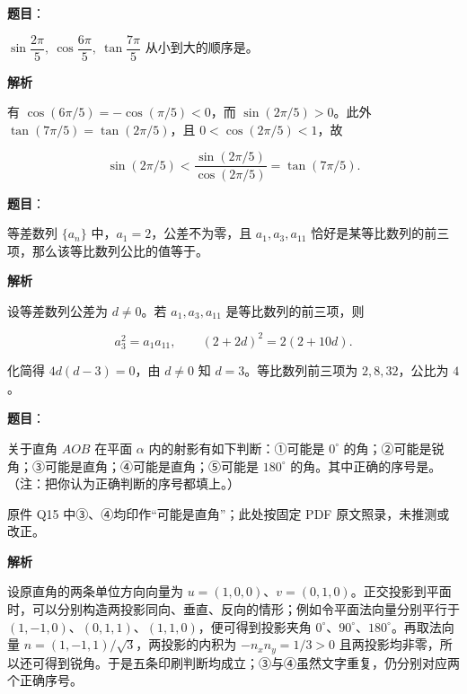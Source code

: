 \begin{answer}

\textbf{题目}：

\(\sin\dfrac{2\pi}{5},\ \cos\dfrac{6\pi}{5},\ \tan\dfrac{7\pi}{5}\) 从小到大的顺序是\gkblank{}。

\textbf{解析}

有 $\cos(6\pi/5)=-\cos(\pi/5)<0$，而 $\sin(2\pi/5)>0$。此外 $\tan(7\pi/5)=\tan(2\pi/5)$，且 $0<\cos(2\pi/5)<1$，故

\nopagebreak[4]
\[\sin(2\pi/5)<\frac{\sin(2\pi/5)}{\cos(2\pi/5)}=\tan(7\pi/5).\]


\end{answer}
\begin{answer}

\textbf{题目}：

等差数列 \(\{a_n\}\) 中，\(a_1=2\)，公差不为零，且 \(a_1,a_3,a_{11}\) 恰好是某等比数列的前三项，那么该等比数列公比的值等于\gkblank{}。

\textbf{解析}

设等差数列公差为 $d\ne0$。若 $a_1,a_3,a_{11}$ 是等比数列的前三项，则

\nopagebreak[4]
\[a_3^2=a_1a_{11},\qquad (2+2d)^2=2(2+10d).\]

化简得 $4d(d-3)=0$，由 $d\ne0$ 知 $d=3$。等比数列前三项为 $2,8,32$，公比为 $4$。


\end{answer}
\begin{answer}

\textbf{题目}：

关于直角 \(AOB\) 在平面 \(\alpha\) 内的射影有如下判断：①可能是 \(0^\circ\) 的角；②可能是锐角；③可能是直角；④可能是直角；⑤可能是 \(180^\circ\) 的角。其中正确的序号是\gkblank{}。（注：把你认为正确判断的序号都填上。）

\begin{gktip}
原件 Q15 中③、④均印作“可能是直角”；此处按固定 PDF 原文照录，未推测或改正。
\end{gktip}

\textbf{解析}

设原直角的两条单位方向向量为 $u=(1,0,0)$、$v=(0,1,0)$。正交投影到平面时，可以分别构造两投影同向、垂直、反向的情形；例如令平面法向量分别平行于 $(1,-1,0)$、$(0,1,1)$、$(1,1,0)$，便可得到投影夹角 $0^\circ$、$90^\circ$、$180^\circ$。再取法向量 $n=(1,-1,1)/\sqrt3$，两投影的内积为 $-n_xn_y=1/3>0$ 且两投影均非零，所以还可得到锐角。于是五条印刷判断均成立；③与④虽然文字重复，仍分别对应两个正确序号。


\end{answer}
